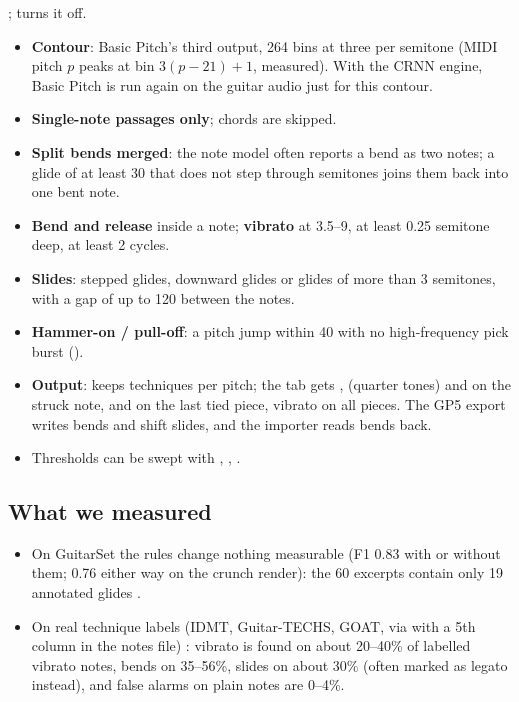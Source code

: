 \begin{inapp}
;  turns it off.
\begin{itemize}
\item \textbf{Contour}: Basic Pitch's third output, 264 bins at three per
  semitone (MIDI pitch $p$ peaks at bin $3(p-21)+1$, measured). With the CRNN
  engine, Basic Pitch is run again on the guitar audio just for this contour.
\item \textbf{Single-note passages only}; chords are skipped.
\item \textbf{Split bends merged}: the note model often reports a bend as two
  notes; a glide of at least 30\ms{} that does not step through semitones joins
  them back into one bent note.
\item \textbf{Bend and release} inside a note; \textbf{vibrato} at 3.5--9\Hz,
  at least 0.25 semitone deep, at least 2 cycles.
\item \textbf{Slides}: stepped glides, downward glides or glides of more than
  3 semitones, with a gap of up to 120\ms{} between the notes.
\item \textbf{Hammer-on / pull-off}: a pitch jump within 40\ms{} with no
  high-frequency pick burst ().
\item \textbf{Output}:  keeps techniques per pitch; the tab gets
  ,  (quarter tones) and  on the
  struck note,  and  on the last tied piece, vibrato
  on all pieces. The GP5 export writes bends and shift slides, and the importer
  reads bends back.
\item Thresholds can be swept with , ,
  .
\end{itemize}
\end{inapp}

\subsection{What we measured}

\begin{itemize}
\item On GuitarSet the rules change nothing measurable (F1 0.83 with or without
  them; 0.76 either way on the crunch render): the 60 excerpts contain only 19
  annotated glides \measured.
\item On real technique labels (IDMT, Guitar-TECHS, GOAT, via
   with a 5th column in the notes file) \measured:
  vibrato is found on about 20--40\% of labelled vibrato notes, bends on
  35--56\%, slides on about 30\% (often marked as legato instead), and false
  alarms on plain notes are 0--4\%.
\end{itemize}

